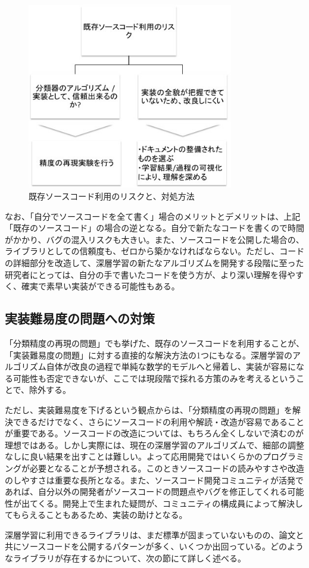 \begin{figure}[tbp]
 \begin{center}
  \includegraphics[width=90mm]{img/c4/library_hedge}
 \end{center}
 \caption{既存ソースコード利用のリスクと、対処方法}
 \label{c4_library_hedge}
\end{figure}
なお、「自分でソースコードを全て書く」場合のメリットとデメリットは、上記「既存のソースコード」の場合の逆となる。自分で新たなコードを書くので時間がかかり、バグの混入リスクも大きい。また、ソースコードを公開した場合の、ライブラリとしての信頼度も、ゼロから築かなければならない。ただし、コードの詳細部分を改造して、深層学習の新たなアルゴリズムを開発する段階に至った研究者にとっては、自分の手で書いたコードを使う方が、より深い理解を得やすく、確実で素早い実装ができる可能性もある。

\subsection{実装難易度の問題への対策}
「分類精度の再現の問題」でも挙げた、既存のソースコードを利用することが、「実装難易度の問題」に対する直接的な解決方法の1つにもなる。深層学習のアルゴリズム自体が改良の過程で単純な数学的モデルへと帰着し、実装が容易になる可能性も否定できないが、ここでは現段階で採れる方策のみを考えるということで、除外する。\par
ただし、実装難易度を下げるという観点からは、「分類精度の再現の問題」を解決できるだけでなく、さらにソースコードの利用や解読・改造が容易であることが重要である。ソースコードの改造については、もちろん全くしないで済むのが理想ではある。しかし実際には、現在の深層学習のアルゴリズムで、細部の調整なしに良い結果を出すことは難しい。よって応用開発ではいくらかのプログラミングが必要となることが予想される。このときソースコードの読みやすさや改造のしやすさは重要な長所となる。また、ソースコード開発コミュニティが活発であれば、自分以外の開発者がソースコードの問題点やバグを修正してくれる可能性が出てくる。開発上で生まれた疑問が、コミュニティの構成員によって解決してもらえることもあるため、実装の助けとなる。\par%
深層学習に利用できるライブラリは、まだ標準が固まっていないものの、論文と共にソースコードを公開するパターンが多く、いくつか出回っている。どのようなライブラリが存在するかについて、次の節にて詳しく述べる。


